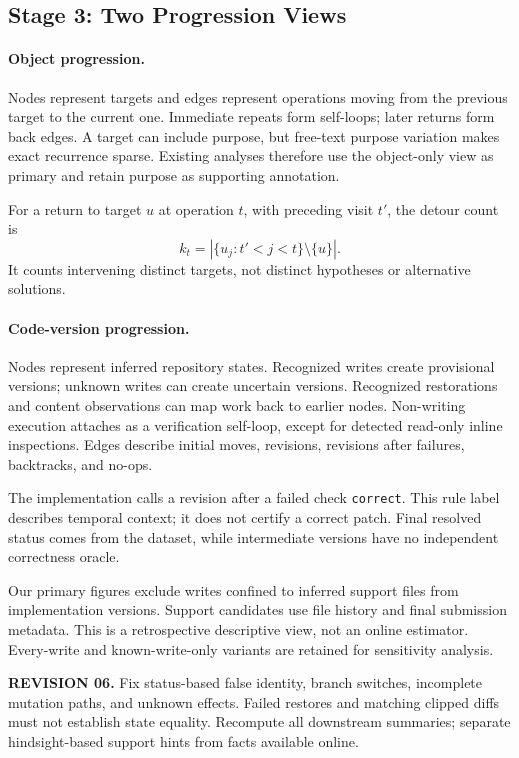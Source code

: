 \documentclass[10pt,a4paper,twocolumn]{article}
\newcommand{\rev}[2]{\par\smallskip\noindent\begin{minipage}{\linewidth}\color{revision}\footnotesize\textbf{REVISION #1.} #2\end{minipage}\par\smallskip}
\begin{document}
\subsection{Stage 3: Two Progression Views}
\paragraph{Object progression.}
Nodes represent targets and edges represent operations moving from the previous target to the current one. Immediate repeats form self-loops; later returns form back edges. A target can include purpose, but free-text purpose variation makes exact recurrence sparse. Existing analyses therefore use the object-only view as primary and retain purpose as supporting annotation.

For a return to target $u$ at operation $t$, with preceding visit $t'$, the detour count is
\begin{equation}
k_t=\left|\{u_j:t'<j<t\}\setminus\{u\}\right|.
\end{equation}
It counts intervening distinct targets, not distinct hypotheses or alternative solutions.

\paragraph{Code-version progression.}
Nodes represent inferred repository states. Recognized writes create provisional versions; unknown writes can create uncertain versions. Recognized restorations and content observations can map work back to earlier nodes. Non-writing execution attaches as a verification self-loop, except for detected read-only inline inspections. Edges describe initial moves, revisions, revisions after failures, backtracks, and no-ops.

The implementation calls a revision after a failed check \texttt{correct}. This rule label describes temporal context; it does not certify a correct patch. Final resolved status comes from the dataset, while intermediate versions have no independent correctness oracle.

Our primary figures exclude writes confined to inferred support files from implementation versions. Support candidates use file history and final submission metadata. This is a retrospective descriptive view, not an online estimator. Every-write and known-write-only variants are retained for sensitivity analysis.
\rev{06}{Fix status-based false identity, branch switches, incomplete mutation paths, and unknown effects. Failed restores and matching clipped diffs must not establish state equality. Recompute all downstream summaries; separate hindsight-based support hints from facts available online.}
\end{document}
